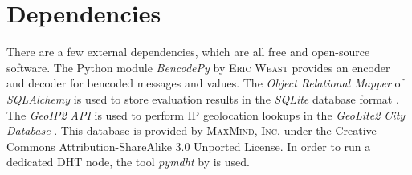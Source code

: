 \documentclass[10pt, a4paper, twoside, headsepline]{scrbook}
\renewcommand{\_}{\origunderscore\allowbreak}
\begin{document}
\section{Dependencies}
There are a few external dependencies, which are all free and open-source software. The Python module \emph{BencodePy} by \textsc{Eric Weast} \cite{bencodepy} provides an encoder and decoder for bencoded messages and values. The \emph{Object Relational Mapper} of \emph{SQLAlchemy} \cite{sqlalchemy} is used to store evaluation results in the \emph{SQLite} database format \cite{sqlite}. The \emph{GeoIP2 API} \cite{geoip2-api} is used to perform IP geolocation lookups in the \emph{GeoLite2 City Database} \cite{geolite2-db}. This database is provided by \textsc{MaxMind, Inc.} under the Creative Commons Attribution-ShareAlike 3.0 Unported License. In order to run a dedicated DHT node, the tool \emph{pymdht} by \textcite{pymdht} is used.
\end{document}
